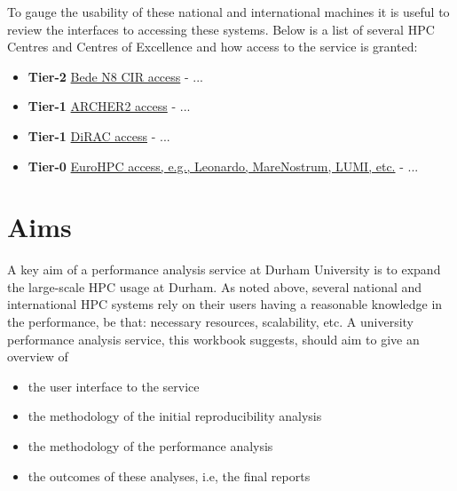 To gauge the usability of these national and international machines it is useful to review the interfaces to accessing these systems. Below is a list of several HPC Centres and Centres of Excellence and how access to the service is granted:
\begin{itemize}
  \item \textbf{Tier-2} \href{https://n8cir.org.uk/bede/accessing-bede/}{Bede N8 CIR access} - ... %
  \item \textbf{Tier-1} \href{https://www.archer2.ac.uk/support-access/access.html}{ARCHER2 access} - ... %
  \item \textbf{Tier-1} \href{https://dirac.ac.uk/getting-access/}{DiRAC access} - ... %
  \item \textbf{Tier-0} \href{https://eurohpc-ju.europa.eu/access-our-supercomputers_en}{EuroHPC access, e.g., Leonardo, MareNostrum, LUMI, etc.} - ... %
\end{itemize}

\section{Aims}

A key aim of a performance analysis service at Durham University is to expand the large-scale HPC usage at Durham. As noted above, several national and international HPC systems rely on their users having a reasonable knowledge in the performance, be that: necessary resources, scalability, etc. A university performance analysis service, this workbook suggests, should aim to give an overview of
\begin{itemize}
    \item the user interface to the service
    \item the methodology of the initial reproducibility analysis
    \item the methodology of the performance analysis
    \item the outcomes of these analyses, i.e, the final reports
\end{itemize}